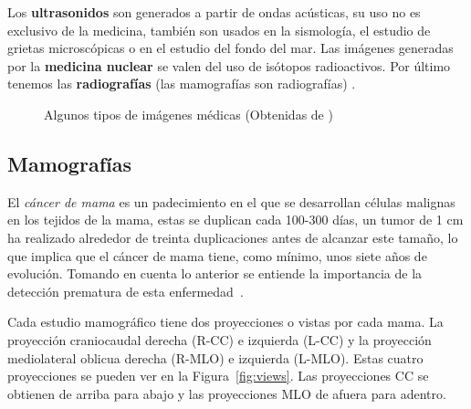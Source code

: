 Los \textbf{ultrasonidos} son generados a partir de ondas acústicas, su uso no
es exclusivo de la medicina, también son usados en la sismología, el estudio de
grietas microscópicas o en el estudio del fondo del mar. Las imágenes generadas
por la \textbf{medicina nuclear} se valen del uso de isótopos radioactivos. Por
último tenemos las \textbf{radiografías} (las mamografías son radiografías)
\cite{suetens2009fundamentals}.

\begin{figure}[h]
    \centering

    \hspace{1cm}
    \hspace{1cm}

  \caption[Algunos tipos de imágenes médicas]{Algunos tipos de imágenes médicas
  (Obtenidas de \cite{ica})}
  
  \label{medicalimages}
\end{figure}

\subsection{Mamografías}

El \textit{cáncer de mama} es un padecimiento en el que se desarrollan células
malignas en los tejidos de la mama, estas se duplican cada 100-300 días, un
tumor de 1 cm ha realizado alrededor de treinta duplicaciones antes de alcanzar
este tamaño, lo que implica que el cáncer de mama tiene, como mínimo, unos
siete años de evolución. Tomando en cuenta lo anterior se entiende la
importancia de la detección prematura de esta enfermedad~\cite{mxcancer}.

Cada estudio mamográfico tiene dos proyecciones o vistas por cada mama. La
proyección craniocaudal derecha (R-CC) e izquierda (L-CC) y la proyección
mediolateral oblicua derecha (R-MLO) e izquierda (L-MLO). Estas cuatro
proyecciones se pueden ver en la Figura~\ref{fig:views}. Las proyecciones CC se
obtienen de arriba para abajo y las proyecciones MLO de afuera para adentro.

